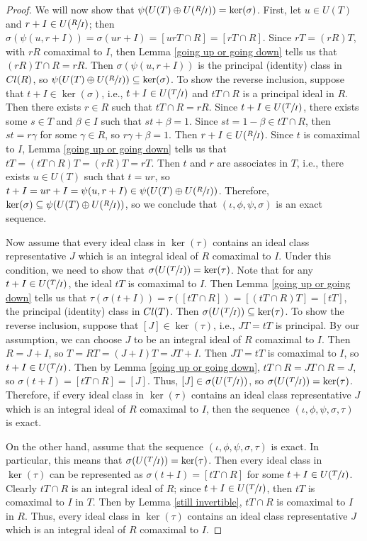 \documentclass[10pt,a4paper]{amsart}
\newcommand{\Cl}{\textup{Cl}}
\begin{document}
\begin{proof}
    We will now show that $\psi(U(T)\oplus U(\sfrac{R}{I}))=\ker(\sigma)$. First, let $u\in U(T)$ and $r+I\in U(\sfrac{R}{I})$; then $\sigma(\psi(u,r+I))=\sigma(ur+I)=[urT\cap R]=[rT\cap R]$. Since $rT=(rR)T$, with $rR$ comaximal to $I$, then Lemma \ref{going up or going down} tells us that $(rR)T\cap R=rR$. Then $\sigma(\psi(u,r+I))$ is the principal (identity) class in $\Cl(R)$, so $\psi(U(T)\oplus U(\sfrac{R}{I}))\subseteq \ker(\sigma)$. To show the reverse inclusion, suppose that $t+I\in \ker(\sigma)$, i.e., $t+I\in U(\sfrac{T}{I})$ and $tT\cap R$ is a principal ideal in $R$. Then there exists $r\in R$ such that $tT\cap R=rR$. Since $t+I\in U(\sfrac{T}{I})$, there exists some $s\in T$ and $\beta\in I$ such that $st+\beta=1$. Since $st=1-\beta\in tT\cap R$, then $st=r\gamma$ for some $\gamma\in R$, so $r\gamma+\beta=1$. Then $r+I\in U(\sfrac{R}{I})$. Since $t$ is comaximal to $I$, Lemma \ref{going up or going down} tells us that $tT=(tT\cap R)T=(rR)T=rT$. Then $t$ and $r$ are associates in $T$, i.e., there exists $u\in U(T)$ such that $t=ur$, so $t+I=ur+I=\psi(u,r+I)\in \psi(U(T)\oplus U(\sfrac{R}{I}))$. Therefore, $\ker(\sigma)\subseteq \psi(U(T)\oplus U(\sfrac{R}{I}))$, so we conclude that $(\iota,\phi,\psi,\sigma)$ is an exact sequence.

    Now assume that every ideal class in $\ker(\tau)$ contains an ideal class representative $J$ which is an integral ideal of $R$ comaximal to $I$. Under this condition, we need to show that $\sigma(U(\sfrac{T}{I}))=\ker(\tau)$. Note that for any $t+I\in U(\sfrac{T}{I})$, the ideal $tT$ is comaximal to $I$. Then Lemma \ref{going up or going down} tells us that $\tau(\sigma(t+I))=\tau([tT\cap R])=[(tT\cap R)T]=[tT]$, the principal (identity) class in $\Cl(T)$. Then $\sigma(U(\sfrac{T}{I}))\subseteq\ker(\tau)$. To show the reverse inclusion, suppose that $[J]\in \ker(\tau)$, i.e., $JT=tT$ is principal. By our assumption, we can choose $J$ to be an integral ideal of $R$ comaximal to $I$. Then $R=J+I$, so $T=RT=(J+I)T=JT+I$. Then $JT=tT$ is comaximal to $I$, so $t+I\in U(\sfrac{T}{I})$. Then by Lemma \ref{going up or going down}, $tT\cap R=JT\cap R=J$, so $\sigma(t+I)=[tT\cap R]=[J]$. Thus, $[J]\in \sigma(U(\sfrac{T}{I}))$, so $\sigma(U(\sfrac{T}{I}))=\ker(\tau)$. Therefore, if every ideal class in $\ker(\tau)$ contains an ideal class representative $J$ which is an integral ideal of $R$ comaximal to $I$, then the sequence $(\iota,\phi,\psi,\sigma,\tau)$ is exact.

    On the other hand, assume that the sequence $(\iota,\phi,\psi,\sigma,\tau)$ is exact. In particular, this means that $\sigma(U(\sfrac{T}{I}))=\ker(\tau)$. Then every ideal class in $\ker(\tau)$ can be represented as $\sigma(t+I)=[tT\cap R]$ for some $t+I\in U(\sfrac{T}{I})$. Clearly $tT\cap R$ is an integral ideal of $R$; since $t+I\in U(\sfrac{T}{I})$, then $tT$ is comaximal to $I$ in $T$. Then by Lemma \ref{still invertible}, $tT\cap R$ is comaximal to $I$ in $R$. Thus, every ideal class in $\ker(\tau)$ contains an ideal class representative $J$ which is an integral ideal of $R$ comaximal to $I$.


\end{proof}
\end{document}
